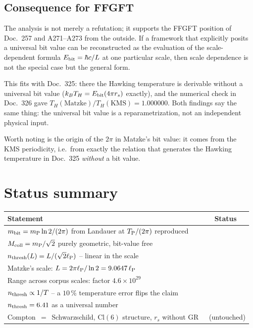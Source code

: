 \subsection{Consequence for FFGFT}

The analysis is not merely a refutation; it supports the FFGFT position
of Doc.~257 and A271--A273 from the outside.
If a framework that explicitly posits a universal bit value can be
reconstructed as the evaluation of the scale-dependent formula
$E_{\mathrm{bit}} = \hbar c/L$ at one particular scale, then scale dependence is
not the special case but the general form.

This fits with Doc.~325: there the Hawking temperature is derivable
without a universal bit value ($k_B T_H = E_{\mathrm{bit}}(4\pi r_s)$ exactly), and
the numerical check in Doc.~326 gave
$T_H(\text{Matzke})/T_H(\text{KMS}) = 1.000000$.
Both findings say the same thing: the universal bit value is a
reparametrization, not an independent physical input.

Worth noting is the origin of the $2\pi$ in Matzke's bit value:
it comes from the KMS periodicity, i.e.\ from exactly the relation that
generates the Hawking temperature in Doc.~325 \emph{without} a bit value.

\section{Status summary}

\begin{center}
\begin{tabular}{@{}lc@{}}
  \toprule
  \textbf{Statement} & \textbf{Status} \\
  \midrule
  $m_{\mathrm{bit}} = m_{\mathrm{P}}\ln 2/(2\pi)$ from Landauer at $T_{\mathrm{P}}/(2\pi)$ reproduced & \B \\
  $M_{\mathrm{coll}} = m_{\mathrm{P}}/\sqrt{2}$ purely geometric, bit-value free & \B \\
  $n_{\mathrm{thresh}}(L) = L/(\sqrt{2}\ell_{\mathrm{P}})$ -- linear in the scale & \B \\
  Matzke's scale: $L = 2\pi\ell_{\mathrm{P}}/\ln 2 = 9.0647\,\ell_{\mathrm{P}}$ & \B \\
  Range across corpus scales: factor $4.6\times10^{29}$ & \B \\
  $n_{\mathrm{thresh}} \propto 1/T$ -- a $10\,\%$ temperature error flips the claim & \B \\
  \midrule
  $n_{\mathrm{thresh}} = 6.41$ as a universal number & \X \\
  Compton~$=$~Schwarzschild, $\mathrm{Cl}(6)$ structure, $r_s$ without GR & \B\ (untouched) \\
  \bottomrule
\end{tabular}
\end{center}

